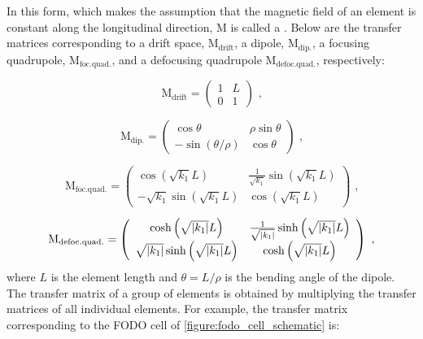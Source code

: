 In this form, which makes the assumption that the magnetic field of an element is constant along the longitudinal direction, M is called a . 
Below are the transfer matrices corresponding to a drift space, \(\mathrm{M_{drift}}\), a dipole, \(\mathrm{M_{dip.}}\), a focusing quadrupole, \(\mathrm{M_{foc. quad.}}\), and a defocusing quadrupole \(\mathrm{M_{defoc. quad.}}\), respectively:

\begin{equation}
    \mathrm{M_{drift}} = \left(
        \begin{array}{ll}
            1 & L \\
            0 & 1
    \end{array} \right) \text{ ,}
    \label{equation:drift_transfer_matrix}
\end{equation}

\begin{equation}
    \mathrm{M_{dip.}} = \left(
        \begin{array}{cc}
            \cos \theta                          & \rho \sin \theta \\
            - \sin \left( \theta / \rho \right)  & \cos \theta
    \end{array} \right) \text{ ,}
    \label{equation:dipole_transfer_matrix}
\end{equation}

\begin{equation}
    \mathrm{M_{foc. quad.}} = \left(
        \begin{array}{cc}
            \cos \left( \sqrt{k_1} L \right)             & \frac{1}{\sqrt{k_1}} \sin \left( \sqrt{k_1} L \right) \\
            -\sqrt{k_1} \sin \left( \sqrt{k_1} L \right) & \cos \left( \sqrt{k_1} L \right)
    \end{array} \right) \text{ ,}
    \label{equation:focusing_quad_transfer_matrix}
\end{equation}

\begin{equation}
    \mathrm{M_{defoc. quad.}} = \left(
        \begin{array}{cc}
            \cosh \left( \sqrt{\left\lvert k_1 \right\rvert} L \right)                 & \frac{1}{\sqrt{\left\lvert k_1 \right\rvert}} \sinh \left( \sqrt{\left\lvert k_1 \right\rvert} L \right) \\
            \sqrt{\left\lvert k_1 \right\rvert} \sinh \left( \sqrt{\left\lvert k_1 \right\rvert} L \right) & \cosh \left( \sqrt{\left\lvert k_1 \right\rvert} L \right)
    \end{array} \right) \text{ ,}
    \label{equation:defocusing_quad_transfer_matrix}
\end{equation}
where \(L\) is the element length and \(\theta = L / \rho\) is the bending angle of the dipole.
The transfer matrix of a group of elements is obtained by multiplying the transfer matrices of all individual elements.
For example, the transfer matrix corresponding to the FODO cell of \cref{figure:fodo_cell_schematic} is:

